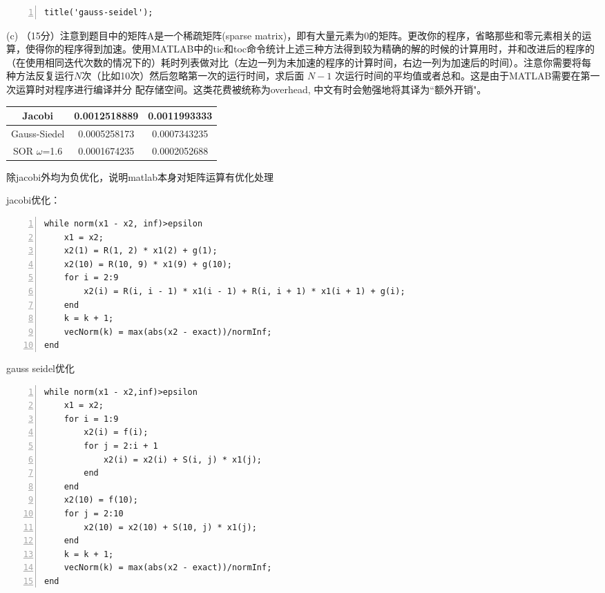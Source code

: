 \documentclass[12pt,a4paper,UTF8]{ctexart}
\begin{document}
\begin{enumerate}
\begin{lstlisting}[frame=single,numbers=left]
title('gauss-seidel');
	\end{lstlisting}
	(c) （15分）注意到题目中的矩阵A是一个稀疏矩阵(sparse matrix)，即有大量元素为0的矩阵。更改你的程序，省略那些和零元素相关的运算，使得你的程序得到加速。使用MATLAB中的tic和toc命令统计上述三种方法得到较为精确的解的时候的计算用时，并和改进后的程序的（在使用相同迭代次数的情况下的）耗时列表做对比（左边一列为未加速的程序的计算时间，右边一列为加速后的时间）。注意你需要将每种方法反复运行$N$次（比如10次）然后忽略第一次的运行时间，求后面 $N-1$ 次运行时间的平均值或者总和。这是由于MATLAB需要在第一次运算时对程序进行编译并分 配存储空间。这类花费被统称为overhead, 中文有时会勉强地将其译为“额外开销"。\\
          \begin{table}[H]
              \centering
              \begin{tabular}{|c|c|c|}
                  \hline
             
                  Jacobi                    & 0.0012518889                 & 0.0011993333                    \\ \hline
                  Gauss-Siedel              & 0.0005258173                    & 0.0007343235                 \\ \hline
                  SOR $\omega$=1.6          & 0.0001674235              & 0.0002052688                   \\ \hline
              \end{tabular}
		\end{table}

		除jacobi外均为负优化，说明matlab本身对矩阵运算有优化处理

	jacobi优化：

\begin{lstlisting}[frame=single,numbers=left]
while norm(x1 - x2, inf)>epsilon
    x1 = x2;
    x2(1) = R(1, 2) * x1(2) + g(1);
    x2(10) = R(10, 9) * x1(9) + g(10);
    for i = 2:9
        x2(i) = R(i, i - 1) * x1(i - 1) + R(i, i + 1) * x1(i + 1) + g(i);
    end
    k = k + 1;
    vecNorm(k) = max(abs(x2 - exact))/normInf;
end
\end{lstlisting}

gauss seidel优化
\begin{lstlisting}[frame=single,numbers=left]
while norm(x1 - x2,inf)>epsilon
    x1 = x2;
    for i = 1:9
        x2(i) = f(i);
        for j = 2:i + 1
            x2(i) = x2(i) + S(i, j) * x1(j);
        end
    end
    x2(10) = f(10);
    for j = 2:10
        x2(10) = x2(10) + S(10, j) * x1(j);
    end
    k = k + 1;
    vecNorm(k) = max(abs(x2 - exact))/normInf;
end
\end{lstlisting}


\end{enumerate}
\end{document}
